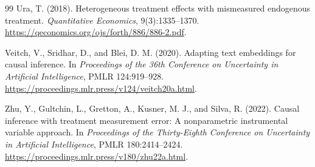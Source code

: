 \documentclass[11pt]{article}
\theoremstyle{definition}
\theoremstyle{plain}
\theoremstyle{remark}
\begin{document}
\begin{thebibliography}{99}
Ura, T. (2018).
\newblock Heterogeneous treatment effects with mismeasured endogenous treatment.
\newblock \emph{Quantitative Economics}, 9(3):1335--1370.
\newblock \url{https://qeconomics.org/ojs/forth/886/886-2.pdf}.

Veitch, V., Sridhar, D., and Blei, D. M. (2020).
\newblock Adapting text embeddings for causal inference.
\newblock In \emph{Proceedings of the 36th Conference on Uncertainty in Artificial Intelligence}, PMLR 124:919--928.
\newblock \url{https://proceedings.mlr.press/v124/veitch20a.html}.

Zhu, Y., Gultchin, L., Gretton, A., Kusner, M. J., and Silva, R. (2022).
\newblock Causal inference with treatment measurement error: A nonparametric instrumental variable approach.
\newblock In \emph{Proceedings of the Thirty-Eighth Conference on Uncertainty in Artificial Intelligence}, PMLR 180:2414--2424.
\newblock \url{https://proceedings.mlr.press/v180/zhu22a.html}.
\end{thebibliography}
\end{document}
